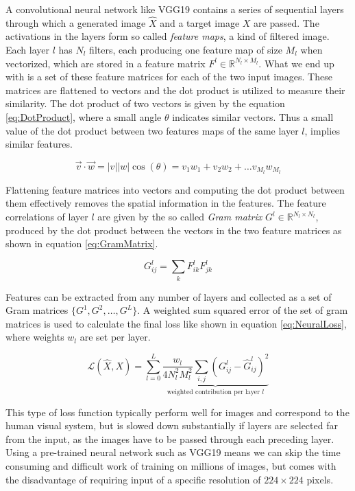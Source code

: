A convolutional neural network like VGG19 contains a series of sequential layers through which a generated image $\hat{X}$ and a target image $X$ are passed. The activations in the layers form so called \textit{feature maps}, a kind of filtered image. Each layer $l$ has $N_l$ filters, each producing one feature map of size $M_l$ when vectorized, which are stored in a feature matrix $F^l \in \mathbb{R}^{N_l \times M_l}$. What we end up with is a set of these feature matrices for each of the two input images. These matrices are flattened to vectors and the dot product is utilized to measure their similarity. The dot product of two vectors is given by the equation \ref{eq:DotProduct}, where a small angle $\theta$ indicates similar vectors. Thus a small value of the dot product between two features maps of the same layer $l$, implies similar features. 

\begin{equation}\label{eq:DotProduct}
    \vec{v} \cdot \vec{w} = \left|v\right|\left|w\right|\cos(\theta) = v_1w_1 + v_2w_2 + \dots v_{M_l}w_{M_l}
\end{equation}

Flattening feature matrices into vectors and computing the dot product between them effectively removes the spatial information in the features. The feature correlations of layer $l$ are given by the so called \textit{Gram matrix} $G^l \in \mathbb{R}^{N_l\times N_l}$, produced by the dot product between the vectors in the two feature matrices as shown in equation \ref{eq:GramMatrix}.

\begin{equation}\label{eq:GramMatrix}
    G^l_{ij} = \sum_k F^l_{ik}F^l_{jk}
\end{equation}

Features can be extracted from any number of layers and collected as a set of Gram matrices $\{G^1, G^2, \dots, G^L\}$. A weighted sum squared error of the set of gram matrices is used to calculate the final loss like shown in equation \ref{eq:NeuralLoss}, where weights $w_l$ are set per layer.

\begin{equation}\label{eq:NeuralLoss}
    \mathcal{\mathcal{L}}(\hat{X},X) = \sum_{l=0}^L\underbrace{\frac{w_l}{4N_l^2M_l^2}\sum_{i,j}\left(G^l_{ij} - \hat{G}^l_{ij}\right)^2}_{\text{weighted contribution per layer }l}
\end{equation}

This type of loss function typically perform well for images and correspond to the human visual system, but is slowed down substantially if layers are selected far from the input, as the images have to be passed through each preceding layer. Using a pre-trained neural network such as VGG19 means we can skip the time consuming and difficult work of training on millions of images, but comes with the disadvantage of requiring input of a specific resolution of $224\times224$ pixels.

